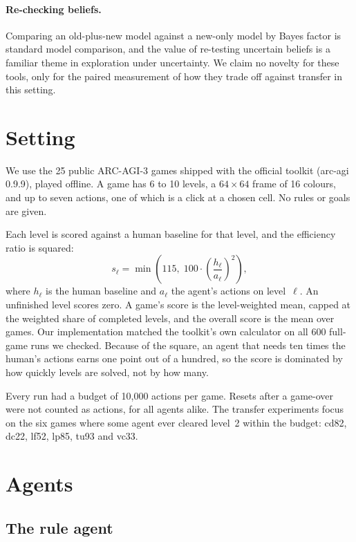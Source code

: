 \documentclass[11pt,a4paper]{article}
\begin{document}
\paragraph{Re-checking beliefs.} Comparing an old-plus-new model against a new-only model by Bayes factor is standard model comparison, and the value of re-testing uncertain beliefs is a familiar theme in exploration under uncertainty. We claim no novelty for these tools, only for the paired measurement of how they trade off against transfer in this setting.

\section{Setting}

We use the 25 public ARC-AGI-3 games shipped with the official toolkit (arc-agi 0.9.9), played offline. A game has 6 to 10 levels, a $64 \times 64$ frame of 16 colours, and up to seven actions, one of which is a click at a chosen cell. No rules or goals are given.

Each level is scored against a human baseline for that level, and the efficiency ratio is squared:
\begin{equation}
  s_\ell = \min\left(115,\; 100 \cdot \left(\frac{h_\ell}{a_\ell}\right)^{2}\right),
\end{equation}
where $h_\ell$ is the human baseline and $a_\ell$ the agent's actions on level~$\ell$. An unfinished level scores zero. A game's score is the level-weighted mean, capped at the weighted share of completed levels, and the overall score is the mean over games. Our implementation matched the toolkit's own calculator on all 600 full-game runs we checked. Because of the square, an agent that needs ten times the human's actions earns one point out of a hundred, so the score is dominated by how quickly levels are solved, not by how many.

Every run had a budget of 10,000 actions per game. Resets after a game-over were not counted as actions, for all agents alike. The transfer experiments focus on the six games where some agent ever cleared level~2 within the budget: cd82, dc22, lf52, lp85, tu93 and vc33.

\section{Agents}

\subsection{The rule agent}
\end{document}
